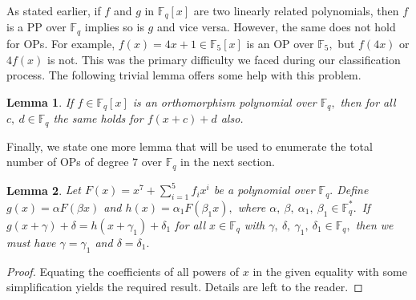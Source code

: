\documentclass[12pt,a4wide, reqno]{amsart}
\newtheorem{lemma}{Lemma}
\theoremstyle{definition}
\theoremstyle{remark}
\numberwithin{equation}{section}
\begin{document}
As stated earlier, if $f$ and $g$ in $\mathbb{F}_q[x]$ are two linearly related polynomials, then $f$ is a PP over $\mathbb{F}_q$ implies so is $g$ and vice versa. However, the same does not hold for OPs. For example, $f(x)=4x+1\in \mathbb{F}_5[x]$ is an OP over $\mathbb{F}_5,$ but $f(4x)$ or $4f(x)$ is not. This was the primary difficulty we faced during our classification process. The following trivial lemma offers some help with this problem.
\begin{lemma} \cite{CPP1} \label{l5}
    If $f\in\mathbb{F}_q[x]$ is an orthomorphism polynomial over $\mathbb{F}_q,$ then for all $c,~d\in\mathbb{F}_q$ the same holds for $f(x+ c)+ d$ also.
\end{lemma}

Finally, we state one more lemma that will be used to enumerate the total number of OPs of degree $7$ over $\mathbb{F}_q$ in the next section.
\begin{lemma}\label{l6}
    Let $F(x)= x^7+\sum_{i=1}^{5}f_ix^i$ be a polynomial over $\mathbb{F}_q.$ Define $g(x)=\alpha F(\beta x)$ and $h(x)=\alpha_1 F(\beta_1 x),$ where $\alpha,~\beta,~\alpha_1,~\beta_1 \in \mathbb{F}_q^*.$~If $g( x+\gamma)+\delta= h(x+\gamma_1)+\delta_1$ for all $x\in \mathbb{F}_q$ with $\gamma,~\delta,~\gamma_1,~\delta_1 \in \mathbb{F}_q,$ then we must have $\gamma=\gamma_1$ and $\delta=\delta_1.$ 
\end{lemma}
\begin{proof}
Equating the coefficients of all powers of $x$ in the given equality with some simplification yields the required result. Details are left to the reader.

\end{proof}
\end{document}
